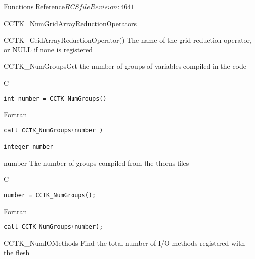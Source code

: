 \begin{cactuspart}{ Functions Reference}{$RCSfile$}{$Revision: 4641 $}
\begin{FunctionDescription}{CCTK\_NumGridArrayReductionOperators}
\begin{SeeAlsoSection}
\begin{SeeAlso}{CCTK\_GridArrayReductionOperator()}
The name of the grid reduction operator, or NULL if none is registered
\end{SeeAlso}
\end{SeeAlsoSection}
\end{FunctionDescription}


\begin{FunctionDescription}{CCTK\_NumGroups}{Get the number of groups of variables compiled in the code}
\label{CCTK-NumGroups}
\begin{SynopsisSection}
\begin{Synopsis}{C}
\begin{verbatim}int number = CCTK_NumGroups()\end{verbatim}
\end{Synopsis}
\begin{Synopsis}{Fortran}
\begin{verbatim}call CCTK_NumGroups(number )

integer number\end{verbatim}
\end{Synopsis}
\end{SynopsisSection}
\begin{ParameterSection}
\begin{Parameter}{number}
The number of groups compiled from the thorns  files
\end{Parameter}
\end{ParameterSection}

\begin{ExampleSection}
\begin{Example}{C}
\begin{verbatim}
number = CCTK_NumGroups();
\end{verbatim}
\end{Example}
\begin{Example}{Fortran}
\begin{verbatim}
call CCTK_NumGroups(number);
\end{verbatim}
\end{Example}
\end{ExampleSection}
\end{FunctionDescription}


\begin{FunctionDescription}{CCTK\_NumIOMethods}
\label{CCTK-NumIOMethods}
Find the total number of I/O methods registered with the flesh


\end{FunctionDescription}
\end{cactuspart}
